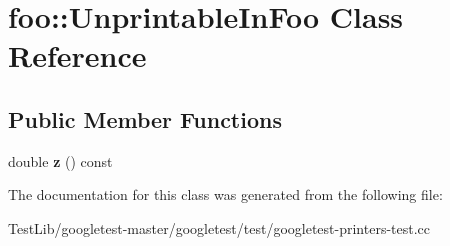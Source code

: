 \hypertarget{classfoo_1_1UnprintableInFoo}{}\section{foo\+:\+:Unprintable\+In\+Foo Class Reference}
\label{classfoo_1_1UnprintableInFoo}
\subsection*{Public Member Functions}
\begin{DoxyCompactItemize}
\item 
\mbox{\label{classfoo_1_1UnprintableInFoo_a3dc8c8e90906bb6f3376474d545e488c}} 
double {\bfseries z} () const
\end{DoxyCompactItemize}


The documentation for this class was generated from the following file\+:\begin{DoxyCompactItemize}
\item 
Test\+Lib/googletest-\/master/googletest/test/googletest-\/printers-\/test.\+cc\end{DoxyCompactItemize}
